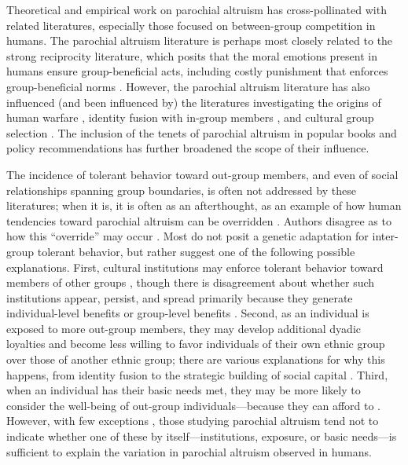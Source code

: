 \documentclass[bibauthoryear]{aa}
\begin{document}
Theoretical and empirical work on parochial altruism has cross-pollinated with related literatures, especially those focused on between-group competition in humans. The parochial altruism literature is perhaps most closely related to the strong reciprocity literature, which posits that the moral emotions present in humans ensure group-beneficial acts, including costly punishment that enforces group-beneficial norms \citep{fehr2002strong, fehr2003strong, gintis2008strong}. However, the parochial altruism literature has also influenced (and been influenced by) the literatures investigating the origins of human warfare \citep{glowacki2017evolutionary, wrangham2012intergroup, zefferman2015evolutionary}, identity fusion with in-group members \citep[i.e., conflating the fitness interests of the self and others;][]{swann2012group,  purzycki2019identity}, and cultural group selection \citep{richerson2016cultural}. The inclusion of the tenets of parochial altruism in popular books \citep{seabright2004company, greene2013moral} and policy recommendations \citep{choi2019parochialism, waring2015} has further broadened the scope of their influence.

The incidence of tolerant behavior toward out-group members, and even of social relationships spanning group boundaries, is often not addressed by these literatures; when it is, it is often as an afterthought, as an example of how human tendencies toward parochial altruism can be overridden \citep{choi2007coevolution, glowacki2017evolutionary}. Authors disagree as to how this ``override'' may occur \citep{pisor2019evolution}. Most do not posit a genetic adaptation for inter-group tolerant behavior, but rather suggest one of the following possible explanations. First, cultural institutions may enforce tolerant behavior toward members of other groups \citep{fearon1996explaining, fry2018evolutionary}, though there is disagreement about whether such institutions appear, persist, and spread primarily because they generate individual-level benefits or group-level benefits \citep[see][for a useful discussion]{purzycki2020institutions}. Second, as an individual is exposed to more out-group members, they may develop additional dyadic loyalties and become less willing to favor individuals of their own ethnic group over those of another ethnic group; there are various explanations for why this happens, from identity fusion to the strategic building of social capital \citep{brewer1976ethnocentrism, beck2006cosmopolitan, buchan2009globalization, fukuyama2001social, hruschka2013economic, mau2008cosmopolitan, singer2011expanding}. Third, when an individual has their basic needs met, they may be more likely to consider the well-being of out-group individuals---because they can afford to \citep{hruschka2014impartial, silva2014cooperation}. However, with few exceptions \citep{hruschka2013economic, vardy2019property}, those studying parochial altruism tend not to indicate whether one of these by itself---institutions, exposure, or basic needs---is sufficient to explain the variation in parochial altruism observed in humans.
\end{document}
